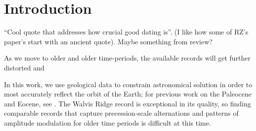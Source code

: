 \documentclass[draft]{agujournal2019}
\begin{document}
%
%
%
%





\section{Introduction}\label{sec:intro}
``Cool quote that addresses how crucial good dating is''. (I like how some of
RZ's paper's start with an ancient quote). Maybe something from
 review?

As we move to older and older time-periods, the available records will get
further distorted and

In this work, we use geological data to constrain astronomical solution in
order to most accurately reflect the orbit of the Earth; for previous work on
the Paleocene and Eocene, see .
The Walvis Ridge record is exceptional in its quality, so finding comparable
records that capture precession-scale alternations and patterns of amplitude
modulation for older time periods is difficult at this time.
\end{document}
